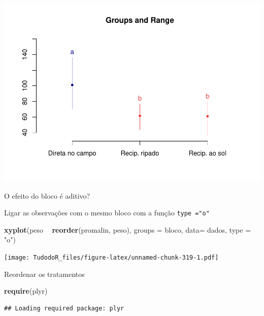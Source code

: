 \documentclass[
]{book}
\newenvironment{Shaded}{\begin{snugshade}}{\end{snugshade}}
\newcommand{\DataTypeTok}[1]{\textcolor[rgb]{0.13,0.29,0.53}{#1}}
\newcommand{\KeywordTok}[1]{\textcolor[rgb]{0.13,0.29,0.53}{\textbf{#1}}}
\newcommand{\NormalTok}[1]{#1}
\newcommand{\OperatorTok}[1]{\textcolor[rgb]{0.81,0.36,0.00}{\textbf{#1}}}
\newcommand{\StringTok}[1]{\textcolor[rgb]{0.31,0.60,0.02}{#1}}
\begin{document}
\includegraphics{TudodoR_files/figure-latex/unnamed-chunk-318-1.pdf}

O efeito do bloco é aditivo?

Ligar as observações com o mesmo bloco com a função \texttt{type\ ="o"}

\begin{Shaded}
\begin{Highlighting}[]
\KeywordTok{xyplot}\NormalTok{(peso }\OperatorTok{~}\StringTok{ }\KeywordTok{reorder}\NormalTok{(promalin, peso), }
        \DataTypeTok{groups =}\NormalTok{ bloco, }
        \DataTypeTok{data=}\NormalTok{ dados,}
        \DataTypeTok{type =} \StringTok{"o"}\NormalTok{)}
\end{Highlighting}
\end{Shaded}

\texttt{[image: TudodoR\_files/figure-latex/unnamed-chunk-319-1.pdf]}

Reordenar os tratamentos

\begin{Shaded}
\begin{Highlighting}[]
\KeywordTok{require}\NormalTok{(plyr)}
\end{Highlighting}
\end{Shaded}

\begin{verbatim}
## Loading required package: plyr
\end{verbatim}

\begin{Shaded}
\end{Shaded}
\end{document}
